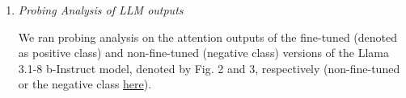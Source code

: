 \documentclass[sigconf, review]{acmart}
\begin{document}
\begin{enumerate}
\begin{enumerate}
        \end{enumerate} %
      
 \item \textit{Probing Analysis of LLM outputs}

     

 
     We ran probing analysis \cite{orgad2024llms} on the attention outputs of the fine-tuned (denoted as positive class) and non-fine-tuned (negative class) versions of the Llama 3.1-8 b-Instruct model, denoted by Fig. 2 and 3, respectively (non-fine-tuned or the negative class \href{https://github.com/YuvrajSingh-mist/Public-Sports-Controversy/blob/master/data/PDFs/Tables.pdf}{here}).



\end{enumerate}
\end{document}
